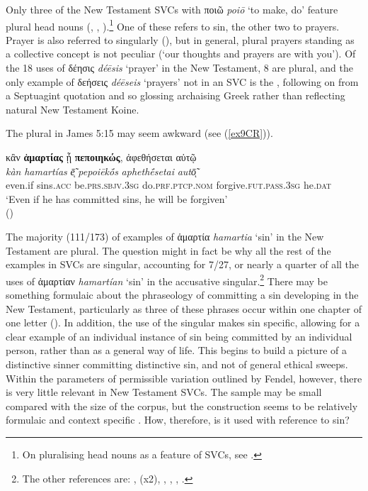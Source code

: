 \documentclass[output=paper,colorlinks,citecolor=brown]{langscibook}
\begin{document}
Only three of the New Testament SVCs with ποιῶ \textit{poiō} ‘to make, do' feature plural head nouns
(, , ).\footnote{On pluralising head
  nouns as a feature of SVCs, see \citet[4]{fendel_i_2023}.} 
One of these refers
to sin, the other two to prayers. Prayer is also referred to singularly
(), but in general, plural prayers standing as a
collective concept is not peculiar (`our thoughts and prayers are with
you'). Of the 18 uses of δέησις \textit{déēsis} ‘prayer' in the New Testament, 8
are plural, and the only example of δεήσεις \textit{déēseis} ‘prayers' not in an SVC is the , following on from a Septuagint quotation and so glossing archaising
Greek rather than reflecting natural New Testament Koine.

The plural in James 5:15 may seem awkward (see (\ref{ex9CR})).

\ea\label{ex9CR} 
\glll κἂν \textbf{ἁμαρτίας} ᾖ \textbf{πεποιηκώς}, ἀφεθήσεται αὐτῷ\\
\textit{kàn} \textit{hamartías} \textit{ē̃ͅ} \textit{pepoiēkṓs} \textit{aphethḗsetai} \textit{autō̃ͅ}\\
    even.if sins.\textsc{acc} be.\textsc{prs.sbjv.3sg} do.\textsc{prf.ptcp.nom} forgive.\textsc{fut.pass.3sg} he.\textsc{dat} \\

\glt `Even if he has committed sins, he will be forgiven' \\
\hspace*{\fill}()
\z

The majority (111/173) of examples of ἁμαρτία \textit{hamartia} ‘sin' in the New
Testament are plural. 
The question might in fact be why all the rest of
the examples in SVCs are singular, accounting for 7/27, or nearly a
quarter of all the uses of ἁμαρτίαν \textit{hamartían} ‘sin' in the accusative
singular.\footnote{The other references are: ,  (x2), , , , .} 
There
may be something formulaic about the phraseology of committing a sin
developing in the New Testament, particularly as three of these phrases
occur within one chapter of one letter (). 
In addition, the use
of the singular makes sin specific, allowing for a clear example of an
individual instance of sin being committed by an individual person,
rather than as a general way of life. 
This begins to build a picture of a distinctive sinner committing distinctive sin, and not of general
ethical sweeps. Within the parameters of permissible variation outlined
by Fendel, however, there is very little relevant in New Testament SVCs.
The sample may be small compared with the size of the corpus, but the
construction seems to be relatively formulaic and context
specific \citep[4–5]{fendel_i_2023}. How, therefore, is it used with
reference to sin?
\end{document}
